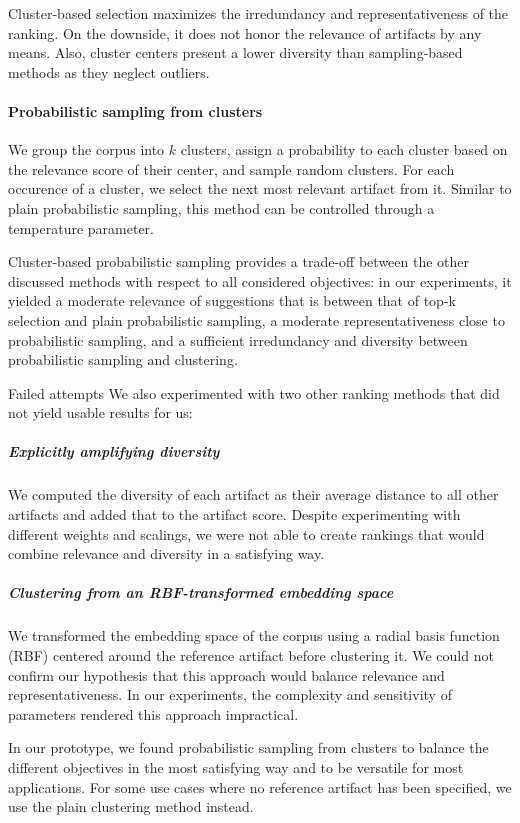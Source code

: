 Cluster-based selection maximizes the irredundancy and representativeness of the ranking.
On the downside, it does not honor the relevance of artifacts by any means.
Also, cluster centers present a lower diversity than sampling-based methods as they neglect outliers.

\paragraph{Probabilistic sampling from clusters}
We group the corpus into $k$ clusters, assign a probability to each cluster based on the relevance score of their center, and sample random clusters.
For each occurence of a cluster, we select the next most relevant artifact from it.
Similar to plain probabilistic sampling, this method can be controlled through a temperature parameter.

Cluster-based probabilistic sampling provides a trade-off between the other discussed methods with respect to all considered objectives:
in our experiments, it yielded a moderate relevance of suggestions that is between that of top-k selection and plain probabilistic sampling, a moderate representativeness close to probabilistic sampling, and a sufficient irredundancy and diversity between probabilistic sampling and clustering.

\begin{genericbox}{Failed attempts}
	We also experimented with two other ranking methods that did not yield usable results for us:

	\subparagraph{Explicitly amplifying diversity}
	We computed the diversity of each artifact as their average distance to all other artifacts and added that to the artifact score.
	Despite experimenting with different weights and scalings, we were not able to create rankings that would combine relevance and diversity in a satisfying way.

	\subparagraph{Clustering from an RBF-transformed embedding space}
	We transformed the embedding space of the corpus using a radial basis function (RBF) centered around the reference artifact before clustering it.
	We could not confirm our hypothesis that this approach would balance relevance and representativeness.
	In our experiments, the complexity and sensitivity of parameters rendered this approach impractical.
\end{genericbox}

\ParSep

In our prototype, we found probabilistic sampling from clusters to balance the different objectives in the most satisfying way and to be versatile for most applications.
For some use cases where no reference artifact has been specified, we use the plain clustering method instead.
